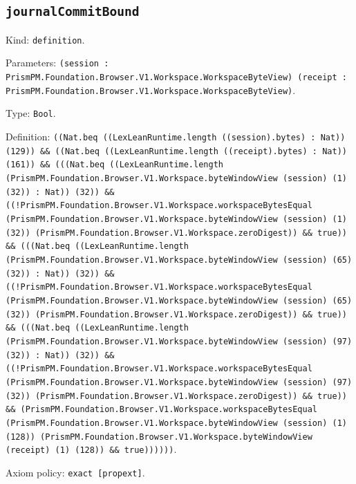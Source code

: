 \documentclass[11pt]{article}
\begin{document}
\subsection*{\texttt{journalCommitBound}}
\noindent Kind: \texttt{definition}.\par
\noindent Parameters: \texttt{(session : PrismPM.Foundation.Browser.V1.Workspace.WorkspaceByteView) (receipt : PrismPM.Foundation.Browser.V1.Workspace.WorkspaceByteView)}.\par
\noindent Type: \texttt{Bool}.\par
\noindent Definition: \texttt{((Nat.beq ((LexLeanRuntime.length ((session).bytes) : Nat)) (129)) \&\& ((Nat.beq ((LexLeanRuntime.length ((receipt).bytes) : Nat)) (161)) \&\& (((Nat.beq ((LexLeanRuntime.length (PrismPM.Foundation.Browser.V1.Workspace.byteWindowView (session) (1) (32)) : Nat)) (32)) \&\& ((!PrismPM.Foundation.Browser.V1.Workspace.workspaceBytesEqual (PrismPM.Foundation.Browser.V1.Workspace.byteWindowView (session) (1) (32)) (PrismPM.Foundation.Browser.V1.Workspace.zeroDigest)) \&\& true)) \&\& (((Nat.beq ((LexLeanRuntime.length (PrismPM.Foundation.Browser.V1.Workspace.byteWindowView (session) (65) (32)) : Nat)) (32)) \&\& ((!PrismPM.Foundation.Browser.V1.Workspace.workspaceBytesEqual (PrismPM.Foundation.Browser.V1.Workspace.byteWindowView (session) (65) (32)) (PrismPM.Foundation.Browser.V1.Workspace.zeroDigest)) \&\& true)) \&\& (((Nat.beq ((LexLeanRuntime.length (PrismPM.Foundation.Browser.V1.Workspace.byteWindowView (session) (97) (32)) : Nat)) (32)) \&\& ((!PrismPM.Foundation.Browser.V1.Workspace.workspaceBytesEqual (PrismPM.Foundation.Browser.V1.Workspace.byteWindowView (session) (97) (32)) (PrismPM.Foundation.Browser.V1.Workspace.zeroDigest)) \&\& true)) \&\& (PrismPM.Foundation.Browser.V1.Workspace.workspaceBytesEqual (PrismPM.Foundation.Browser.V1.Workspace.byteWindowView (session) (1) (128)) (PrismPM.Foundation.Browser.V1.Workspace.byteWindowView (receipt) (1) (128)) \&\& true))))))}.\par
\noindent Axiom policy: \texttt{exact [propext]}.\par
\end{document}

